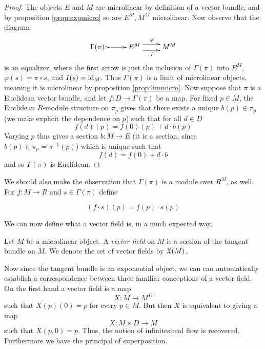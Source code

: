 \begin{proof}
  The objects \( E \) and \( M \) are microlinear by definition of a vector bundle, and by proposition \ref{prop:expmicro} so are \( E^M, M^M \) microlinear. Now observe that the diagram
  \begin{equation*}
    \xymatrix{
      {\Gamma(\pi)\,\,} \ar@{>->}[r] & E^M \ar@<1ex>[r]^{\varphi} \ar@<-1ex>[r]_{I} & M^M 
    }
  \end{equation*}
  is an equalizer, where the first arrow is just the inclusion of \( \Gamma(\pi) \) into \( E^M \), \( \varphi(s) = \pi\circ s \), and \( I(s) = \operatorname{id}_M \). Thus \( \Gamma(\pi) \) is a limit of microlinear objects, meaning it is microlinear by proposition \ref{prop:limmicro}. Now suppose that \( \pi \) is a Euclidean vector bundle, and let \( f:D\to \Gamma(\pi) \) be a map. For fixed \( p\in M \), the Euclidean \( R \)-module structure on \( \pi_p \) gives that there exists a unique \( b(p)\in \pi_p \) (we make explicit the dependence on \( p \)) such that for all \( d\in D \)
  \begin{equation*}
    f(d)(p) = f(0)(p) + d\cdot b(p)
  \end{equation*}
  Varying \( p \) thus gives a section \( b:M\to E \) (it is a section, since \( b(p)\in \pi_p = \pi^{-1}(p) \)) which is unique such that
  \begin{equation*}
    f(d) = f(0) + d\cdot b
  \end{equation*}
  and so \( \Gamma(\pi) \) is Euclidean.
\end{proof}

We should also make the observation that \( \Gamma(\pi) \) is a module over \( R^M \), as well. For \( f:M\to R \) and \( s\in \Gamma(\pi) \) define

\begin{equation*}
  (f\cdot s)(p)=f(p)\cdot s(p)
\end{equation*}

We can now define what a vector field is, in a much expected way.

\begin{defn}
  Let \( M \) be a microlinear object. A \emph{vector field} on \( M \) is a section of the tangent bundle on \( M \). We denote the set of vector fields by \( \mathfrak X(M) \).
\end{defn}

Now since the tangent bundle is an exponential object, we can can automatically establish a correspondence between three familiar conceptions of a vector field. On the first hand a vector field is a map
\begin{equation*}
  X:M\to M^D
\end{equation*}
such that \( X(p)(0)=p \) for every \( p\in M \). But then \( X \) is equivalent to giving a map
\begin{equation*}
  X:M\times D \to M
\end{equation*}
such that \( X(p,0)=p \). Thus, the notion of infinitesimal flow is recovered. Furthermore we have the principal of superposition.

